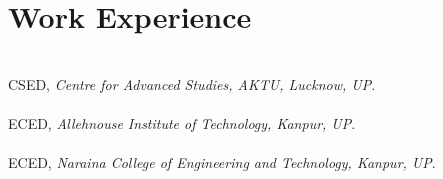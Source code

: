 \vspace{-2.5em}\section{Work Experience}
  \\
CSED, {\sl Centre for Advanced Studies, AKTU, Lucknow, UP}.\\
 \\
ECED, {\sl Allehnouse Institute of Technology, Kanpur, UP}.\\
  \\
ECED, {\sl Naraina College of Engineering and Technology, Kanpur, UP}.\\
\vspace{-1em}
\sectionline
